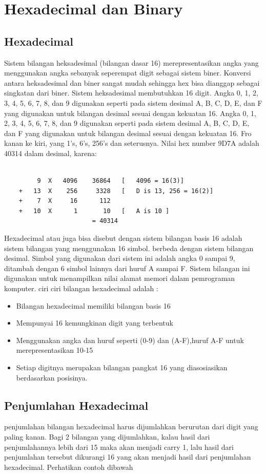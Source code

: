 \section {Hexadecimal dan Binary}

\subsection {Hexadecimal}
Sistem bilangan heksadesimal (bilangan dasar 16) merepresentasikan angka yang menggunakan angka sebanyak seperempat digit sebagai sistem biner. Konversi antara heksadesimal dan biner sangat mudah sehingga hex bisa dianggap sebagai singkatan dari biner. Sistem heksadesimal membutuhkan 16 digit. Angka 0, 1, 2, 3, 4, 5, 6, 7, 8, dan 9 digunakan seperti pada sistem desimal A, B, C, D, E, dan F yang digunakan untuk bilangan desimal sesuai dengan kekuatan 16. Angka 0, 1, 2, 3, 4, 5, 6, 7, 8, dan 9 digunakan seperti pada sistem desimal A, B, C, D, E, dan F yang digunakan untuk bilangan desimal sesuai dengan kekuatan 16. Fro kanan ke kiri, yang 1's, 6's, 256's dan seterusnya. Nilai hex number 9D7A adalah 40314 dalam desimal, karena:
	\begin{verbatim}

		 9	X	4096	36864	[	4096 = 16(3)]
	+	13	X	 256	 3328	[	D is 13, 256 = 16(2)]
	+	 7	X	  16	  112
	+	10	X	   1	   10	[	A is 10	]
						= 40314
	\end{verbatim}
	
Hexadecimal atau juga bisa disebut dengan sistem bilangan basis 16 adalah sistem bilangan yang menggunakan 16 simbol. berbeda dengan sistem bilangan desimal. Simbol yang digunakan dari sistem ini adalah angka 0 sampai 9, ditambah dengan 6 simbol lainnya dari huruf A sampai F. Sistem bilangan ini digunakan untuk menampilkan nilai alamat memori dalam pemrograman komputer.
ciri ciri bilangan hexadecimal adalah :

\begin{itemize}
	\item Bilangan hexadecimal memiliki bilangan basis 16
	\item Mempunyai 16 kemungkinan digit yang terbentuk
	\item Menggunakan angka dan huruf seperti (0-9) dan (A-F),huruf A-F untuk merepresentasikan 10-15
	\item Setiap digitnya merupakan bilangan pangkat 16 yang diasosiasikan berdasarkan posisinya.
\end{itemize}

\subsection {Penjumlahan Hexadecimal}
penjumlahan bilangan hexadecimal harus dijumlahkan berurutan dari digit yang paling kanan. Bagi 2 bilangan yang dijumlahkan, kalau hasil dari penjumlahannya lebih dari 15 maka akan menjadi carry 1, lalu hasil dari penjumlahan tersebut dikurangi 16 yang akan menjadi hasil dari penjumlahan hexadecimal. Perhatikan contoh dibawah

